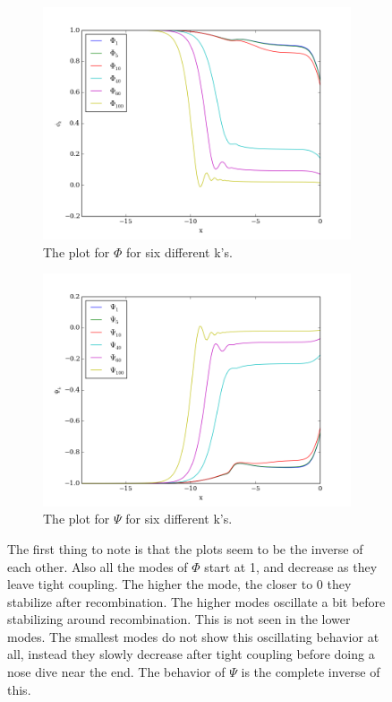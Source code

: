 \documentclass[a4paper]{report}
\begin{document}
\begin{figure}[ht]
\begin{subfigure}{.5\textwidth}
  \includegraphics[width=\textwidth]{Phi.png}
 \caption{The plot for $\Phi$ for six different k's.}
 \label{fig:Phi}
\end{subfigure}
\begin{subfigure}{.5\textwidth}
\includegraphics[width=\textwidth]{Psi.png}
 \caption{The plot for $\Psi$ for six different k's.}
 \label{fig:Psi}
\end{subfigure}
\caption{The first thing to note is that the plots seem to be the inverse of each other. Also all the modes of $\Phi$ start at 1, and decrease as they leave tight coupling. The higher the mode, the closer to 0 they stabilize after recombination. The higher modes oscillate a bit before stabilizing around recombination. This is not seen in the lower modes. The smallest modes do not show this oscillating behavior at all, instead they slowly decrease after tight coupling before doing a nose dive near the end. The behavior of $\Psi$ is the complete inverse of this.}
\end{figure}
\end{document}
